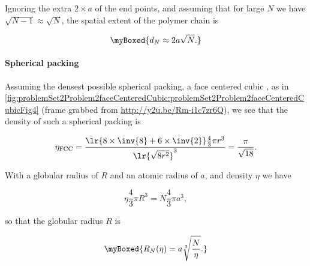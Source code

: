 {Ignoring the extra $2 \times a$ of the end points, and assuming that for large $N$ we have $\sqrt{N-1} \approx \sqrt{N}$, the spatial extent of the polymer chain is

\begin{equation}\label{eqn:basicStatMechProblemSet3Problem2:140}
\myBoxed{
d_N \approx 2 a \sqrt{N}.
}
\end{equation}

%

\paragraph{Spherical packing}

Assuming the densest possible spherical packing, a face centered cubic \citep{wiki:spherePacking}, as in \cref{fig:problemSet2Problem2faceCenteredCubic:problemSet2Problem2faceCenteredCubicFig4} (frame grabbed from \href{http://y2u.be/Rm-i1c7zr6Q}{http://y2u.be/Rm-i1c7zr6Q}), we see that the density of such a spherical packing is


\begin{equation}\label{eqn:basicStatMechProblemSet3Problem2:160}
\eta_{\mathrm{FCC}} =
\frac{\lr{8 \times \inv{8} + 6 \times \inv{2} } \frac{4}{3} \pi r^3}{ \lr{ \sqrt{8 r^2} }^3 }
= 
\frac{\pi}{\sqrt{18}}.
\end{equation}

With a globular radius of $R$ and an atomic radius of $a$, and density $\eta$ we have

\begin{equation}\label{eqn:basicStatMechProblemSet3Problem2:200}
\eta \frac{4}{3} \pi R^3 = N \frac{4}{3} \pi a^3,
\end{equation}

so that the globular radius $R$ is 

\begin{equation}\label{eqn:basicStatMechProblemSet3Problem2:180}
\myBoxed{
R_N(\eta) = a \sqrt[3]{\frac{N}{\eta}}.
}
\end{equation}

}
